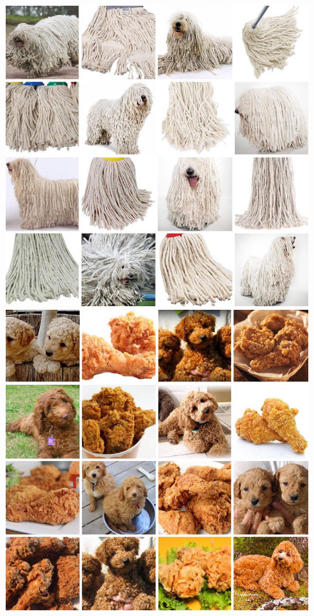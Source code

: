 \documentclass[a4paper, oneside]{discothesis}
\begin{document}
\begin{figure}[th]
	\begin{minipage}[t]{0.24\textwidth}\centering\includegraphics[width=\textwidth]{figures/dog-vs-mop.jpeg}\end{minipage}
	\hfill
	\begin{minipage}[t]{0.24\textwidth}\centering\includegraphics[width=\textwidth]{figures/dog-vs-chicken.jpeg}\end{minipage}

\end{figure}
\end{document}
